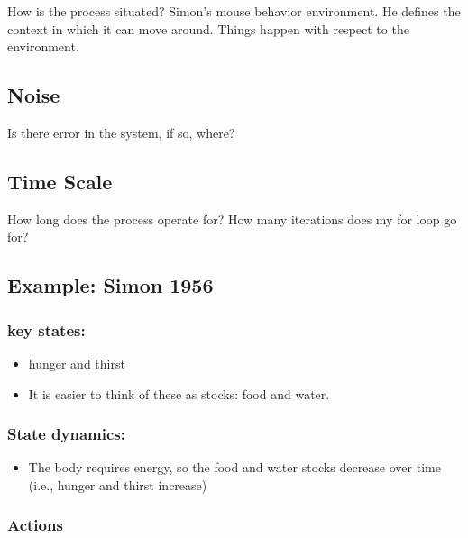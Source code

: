 \documentclass[english,,man]{apa6}
\providecommand{\tightlist}{%
  \setlength{\itemsep}{0pt}\setlength{\parskip}{0pt}}
\theoremstyle{definition}
\theoremstyle{definition}
\theoremstyle{definition}
\theoremstyle{remark}
\begin{document}
How is the process situated? Simon's mouse behavior environment. He
defines the context in which it can move around. Things happen with
respect to the environment.

\hypertarget{noise}{%
\subsection{Noise}\label{noise}}

Is there error in the system, if so, where?

\hypertarget{time-scale}{%
\subsection{Time Scale}\label{time-scale}}

How long does the process operate for? How many iterations does my for
loop go for?

\hypertarget{example-simon-1956}{%
\subsection{Example: Simon 1956}\label{example-simon-1956}}

\hypertarget{key-states-1}{%
\subsubsection{key states:}\label{key-states-1}}

\begin{itemize}
\tightlist
\item
  hunger and thirst
\item
  It is easier to think of these as stocks: food and water.
\end{itemize}

\hypertarget{state-dynamics-1}{%
\subsubsection{State dynamics:}\label{state-dynamics-1}}

\begin{itemize}
\tightlist
\item
  The body requires energy, so the food and water stocks decrease over
  time (i.e., hunger and thirst increase)
\end{itemize}

\hypertarget{actions-1}{%
\subsubsection{Actions}\label{actions-1}}
\end{document}
